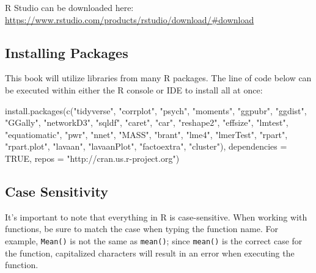\documentclass[
]{book}
\newenvironment{Shaded}{\begin{snugshade}}{\end{snugshade}}
\newcommand{\AttributeTok}[1]{\textcolor[rgb]{0.77,0.63,0.00}{#1}}
\newcommand{\ConstantTok}[1]{\textcolor[rgb]{0.00,0.00,0.00}{#1}}
\newcommand{\FunctionTok}[1]{\textcolor[rgb]{0.00,0.00,0.00}{#1}}
\newcommand{\NormalTok}[1]{#1}
\newcommand{\StringTok}[1]{\textcolor[rgb]{0.31,0.60,0.02}{#1}}
\begin{document}
R Studio can be downloaded here: \url{https://www.rstudio.com/products/rstudio/download/\#download}

\hypertarget{installing-packages}{%
\subsection{Installing Packages}\label{installing-packages}}

This book will utilize libraries from many R packages. The line of code below can be executed within either the R console or IDE to install all at once:

\begin{Shaded}
\begin{Highlighting}[]
\FunctionTok{install.packages}\NormalTok{(}\FunctionTok{c}\NormalTok{(}\StringTok{"tidyverse"}\NormalTok{, }\StringTok{"corrplot"}\NormalTok{, }\StringTok{"psych"}\NormalTok{, }\StringTok{"moments"}\NormalTok{, }\StringTok{"ggpubr"}\NormalTok{, }\StringTok{"ggdist"}\NormalTok{, }\StringTok{"GGally"}\NormalTok{, }\StringTok{"networkD3"}\NormalTok{, }\StringTok{"sqldf"}\NormalTok{, }\StringTok{"caret"}\NormalTok{, }\StringTok{"car"}\NormalTok{, }\StringTok{"reshape2"}\NormalTok{, }\StringTok{"effsize"}\NormalTok{, }\StringTok{"lmtest"}\NormalTok{, }\StringTok{"equatiomatic"}\NormalTok{, }\StringTok{"pwr"}\NormalTok{, }\StringTok{"nnet"}\NormalTok{, }\StringTok{"MASS"}\NormalTok{, }\StringTok{"brant"}\NormalTok{, }\StringTok{"lme4"}\NormalTok{, }\StringTok{"lmerTest"}\NormalTok{, }\StringTok{"rpart"}\NormalTok{, }\StringTok{"rpart.plot"}\NormalTok{, }\StringTok{"lavaan"}\NormalTok{, }\StringTok{"lavaanPlot"}\NormalTok{, }\StringTok{"factoextra"}\NormalTok{, }\StringTok{"cluster"}\NormalTok{), }\AttributeTok{dependencies =} \ConstantTok{TRUE}\NormalTok{, }\AttributeTok{repos =} \StringTok{"http://cran.us.r{-}project.org"}\NormalTok{)}
\end{Highlighting}
\end{Shaded}

\hypertarget{case-sensitivity}{%
\subsection{Case Sensitivity}\label{case-sensitivity}}

It's important to note that everything in R is case-sensitive. When working with functions, be sure to match the case when typing the function name. For example, \texttt{Mean()} is not the same as \texttt{mean()}; since \texttt{mean()} is the correct case for the function, capitalized characters will result in an error when executing the function.
\end{document}
